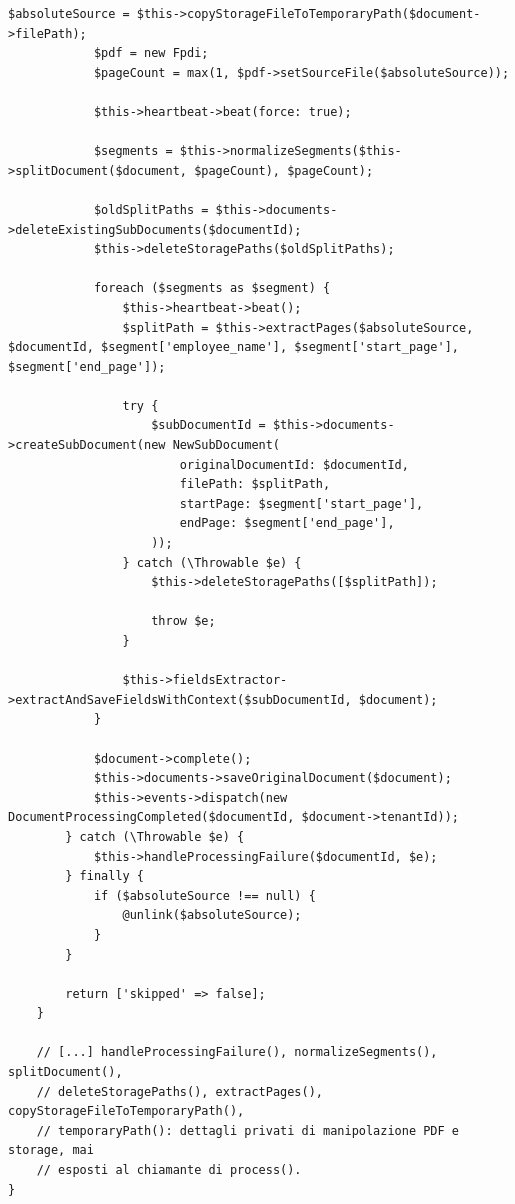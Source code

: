 \documentclass[a4paper,12pt]{article}
\begin{document}
\begin{sloppypar}
\begin{lstlisting}[style=phplisting, caption={ProcessDocumentService: Facade su repository, storage, gateway AI, eventi ed heartbeat dietro process()}]
            $absoluteSource = $this->copyStorageFileToTemporaryPath($document->filePath);
            $pdf = new Fpdi;
            $pageCount = max(1, $pdf->setSourceFile($absoluteSource));

            $this->heartbeat->beat(force: true);

            $segments = $this->normalizeSegments($this->splitDocument($document, $pageCount), $pageCount);

            $oldSplitPaths = $this->documents->deleteExistingSubDocuments($documentId);
            $this->deleteStoragePaths($oldSplitPaths);

            foreach ($segments as $segment) {
                $this->heartbeat->beat();
                $splitPath = $this->extractPages($absoluteSource, $documentId, $segment['employee_name'], $segment['start_page'], $segment['end_page']);

                try {
                    $subDocumentId = $this->documents->createSubDocument(new NewSubDocument(
                        originalDocumentId: $documentId,
                        filePath: $splitPath,
                        startPage: $segment['start_page'],
                        endPage: $segment['end_page'],
                    ));
                } catch (\Throwable $e) {
                    $this->deleteStoragePaths([$splitPath]);

                    throw $e;
                }

                $this->fieldsExtractor->extractAndSaveFieldsWithContext($subDocumentId, $document);
            }

            $document->complete();
            $this->documents->saveOriginalDocument($document);
            $this->events->dispatch(new DocumentProcessingCompleted($documentId, $document->tenantId));
        } catch (\Throwable $e) {
            $this->handleProcessingFailure($documentId, $e);
        } finally {
            if ($absoluteSource !== null) {
                @unlink($absoluteSource);
            }
        }

        return ['skipped' => false];
    }

    // [...] handleProcessingFailure(), normalizeSegments(), splitDocument(),
    // deleteStoragePaths(), extractPages(), copyStorageFileToTemporaryPath(),
    // temporaryPath(): dettagli privati di manipolazione PDF e storage, mai
    // esposti al chiamante di process().
}
\end{lstlisting}


\end{sloppypar}
\end{document}
